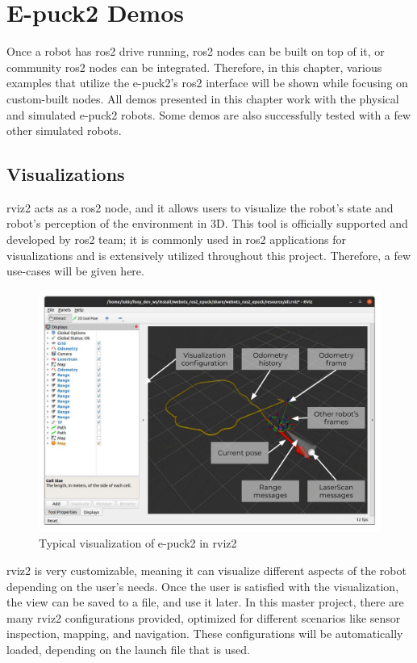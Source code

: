 \chapter{E-puck2 Demos}
\label{chap:demos}

Once a robot has \ac{ros2} drive running, \ac{ros2} nodes can be built on top of it, or community \ac{ros2} nodes can be integrated.
Therefore, in this chapter, various examples that utilize the e-puck2's \ac{ros2} interface will be shown while focusing on custom-built nodes.
All demos presented in this chapter work with the physical and simulated e-puck2 robots.
Some demos are also successfully tested with a few other simulated robots.

\section{Visualizations}
\acs{rviz2} acts as a \ac{ros2} node, and it allows users to visualize the robot's state and robot's perception of the environment in 3D.
This tool is officially supported and developed by \ac{ros2} team; it is commonly used in \ac{ros2} applications for visualizations and is extensively utilized throughout this project. 
Therefore, a few use-cases will be given here.

\begin{figure}[H]
    \centering
    \includegraphics[width=\textwidth]{demos/figures/rviz.pdf}
    \caption{Typical visualization of e-puck2 in \acs{rviz2}}
    \label{fig:demos:rviz}
\end{figure}

\ac{rviz2} is very customizable, meaning it can visualize different aspects of the robot depending on the user's needs.
Once the user is satisfied with the visualization, the view can be saved to a file, and use it later.
In this master project, there are many \ac{rviz2} configurations provided, optimized for different scenarios like sensor inspection, mapping, and navigation.
These configurations will be automatically loaded, depending on the launch file that is used.


